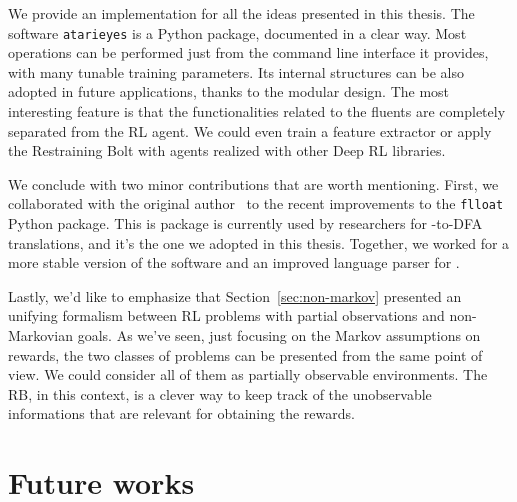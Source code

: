 \begin{description}[style=nextline]
	\item[The \texttt{atarieyes} package]
		We provide an implementation for all the ideas presented in this thesis.
		The software \texttt{atarieyes} is a Python package, documented in a clear
		way.  Most operations can be performed just from the command line
		interface it provides, with many tunable training parameters. Its internal
		structures can be also adopted in future applications, thanks to the
		modular design. The most interesting feature is that the functionalities
		related to the fluents are completely separated from the RL agent. We
		could even train a feature extractor or apply the Restraining Bolt with
		agents realized with other Deep RL libraries.

\end{description}

We conclude with two minor contributions that are worth mentioning. First, we
collaborated with the original author~\cite{bib:favorito-thesis} to the recent
improvements to the \texttt{flloat} Python package. This is package is
currently used by researchers for \ldl{}-to-DFA translations, and it's the one
we adopted in this thesis. Together, we worked for a more stable version of
the software and an improved language parser for \ldl{}.

Lastly, we'd like to emphasize that Section~\ref{sec:non-markov} presented an
unifying formalism between RL problems with partial observations and
non-Markovian goals. As we've seen, just focusing on the Markov assumptions on
rewards, the two classes of problems can be presented from the same point of
view. We could consider all of them as partially observable environments. The
RB, in this context, is a clever way to keep track of the unobservable
informations that are relevant for obtaining the rewards.


\section{Future works}

\label{sec:future}

